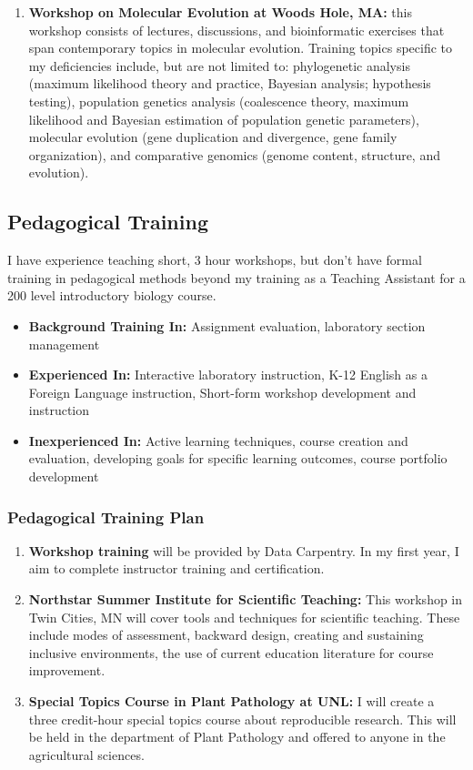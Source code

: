 \documentclass[12pt,letterpaper]{article}
\begin{document}
\begin{enumerate}
  \item \textbf{Workshop on Molecular Evolution at Woods Hole, MA:} this workshop consists of lectures, discussions, and bioinformatic exercises that span contemporary topics in molecular evolution. Training topics specific to my deficiencies include, but are not limited to: phylogenetic analysis (maximum likelihood theory and practice, Bayesian analysis; hypothesis testing), population genetics analysis (coalescence theory, maximum likelihood and Bayesian estimation of population genetic parameters), molecular evolution (gene duplication and divergence, gene family organization), and comparative genomics (genome content, structure, and evolution).
\end{enumerate}


\subsection{Pedagogical Training}

I have experience teaching short, 3 hour workshops, but don't have formal training in pedagogical methods beyond my training as a Teaching Assistant for a 200 level introductory biology course. 

\begin{itemize}
  \item \textbf{Background Training In: } Assignment evaluation, laboratory section management
  \item \textbf{Experienced In: } Interactive laboratory instruction, K-12 English as a Foreign Language instruction, Short-form workshop development and
  instruction
  \item \textbf{Inexperienced In: } Active learning techniques, course creation and evaluation, developing goals for specific learning outcomes, course portfolio development
\end{itemize}

\subsubsection{Pedagogical Training Plan}

\begin{enumerate}
  \item \textbf{Workshop training} will be provided by Data Carpentry. In my first year, I aim to complete instructor training and certification.
  \item \textbf{Northstar Summer Institute for Scientific Teaching:} This workshop in Twin Cities, MN will cover tools and techniques for scientific teaching. These include modes of assessment, backward design, creating and sustaining inclusive environments, the use of current education literature for course improvement.
  \item \textbf{Special Topics Course in Plant Pathology at UNL:} I will create a three credit-hour special topics course about reproducible research. This will be held in the department of Plant Pathology and offered to anyone in the agricultural sciences. 
\end{enumerate}
\end{document}
